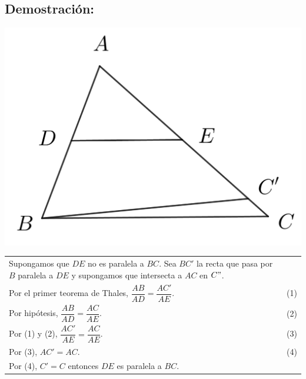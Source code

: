 \documentclass[12pt,a4paper]{article}
\begin{document}
\subsection*{Demostración:} 
\begin{center}
\includegraphics[scale=0.6]{thales1.1.png} 
\end{center}
\begin{tabular}{p{15.9 cm}p{1 cm}}
Supongamos que $DE$ no es paralela a $BC$. Sea $BC'$ la recta que pasa por $B$ paralela a $DE$ y supongamos que intersecta a $AC$ en $C"$.
\\Por el primer teorema de Thales, $\dfrac{AB}{AD}=\dfrac{AC'}{AE}$. & (1)
\\Por hipótesis, $\dfrac{AB}{AD}=\dfrac{AC}{AE}$. & (2) 
\\Por (1) y (2), $\dfrac{AC'}{AE}=\dfrac{AC}{AE}$. &(3)
\\Por (3), $AC'=AC$. & (4) 
\\Por (4), $C'=C$ entonces $DE$ es paralela a $BC$.
\end{tabular}
\end{document}
